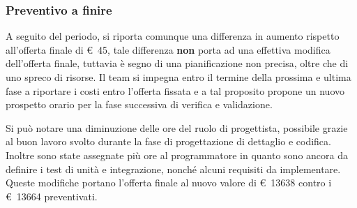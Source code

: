     \subsubsection{Preventivo a finire}
        A seguito del periodo, si riporta comunque una differenza in aumento rispetto all'offerta finale di \euro\ 45,
        tale differenza \textbf{non} porta ad una effettiva modifica dell'offerta finale, tuttavia è segno di una pianificazione non precisa,
        oltre che di uno spreco di risorse.
        Il team si impegna entro il termine della prossima e ultima fase a riportare i costi entro l'offerta fissata e a tal proposito propone
        un nuovo prospetto orario per la fase successiva di verifica e validazione.
        \def\salarycontent{
            {Amministratore,16,20,320},
            {Analista,0,25,0},
            {Progettista,$48-\noexpand\textbf{8}$,22,880},
            {Programmatore,$43+\noexpand\textbf{7}$,15,750},
            {Responsabile,15,30,450},
            {Verificatore,60,15,900},
            {Totale,181,127,$3371-\noexpand\textbf{71} = 3300 $ },
        }
        
        \label{table:nuovo_orario_verifica}
        Si può notare una diminuzione delle ore del ruolo di progettista, possibile grazie
        al buon lavoro svolto durante la fase di progettazione di dettaglio e codifica.
        Inoltre sono state assegnate più ore al programmatore in quanto sono ancora da definire
        i test di unità e integrazione, nonché alcuni requisiti da implementare. \\
        \noindent Queste modifiche portano l'offerta finale al nuovo valore di \euro\ 13638 contro
        i \euro\ 13664 preventivati.
